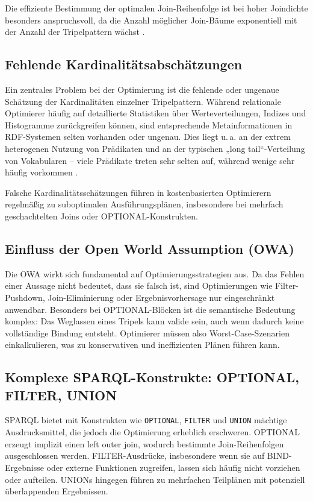 \documentclass[12pt]{article}
\begin{document}
Die effiziente Bestimmung der optimalen Join-Reihenfolge ist bei hoher Joindichte besonders anspruchsvoll, da die Anzahl möglicher Join-Bäume exponentiell mit der Anzahl der Tripelpattern wächst \cite{gubichev2013sparql}.

\subsection{Fehlende Kardinalitätsabschätzungen}

Ein zentrales Problem bei der Optimierung ist die fehlende oder ungenaue Schätzung der Kardinalitäten einzelner Tripelpattern. Während relationale Optimierer häufig auf detaillierte Statistiken über Werteverteilungen, Indizes und Histogramme zurückgreifen können, sind entsprechende Metainformationen in RDF-Systemen selten vorhanden oder ungenau. Dies liegt u.\,a. an der extrem heterogenen Nutzung von Prädikaten und an der typischen „long tail“-Verteilung von Vokabularen – viele Prädikate treten sehr selten auf, während wenige sehr häufig vorkommen \cite{stahl2012rdf}.

Falsche Kardinalitätsschätzungen führen in kostenbasierten Optimierern regelmäßig zu suboptimalen Ausführungsplänen, insbesondere bei mehrfach geschachtelten Joins oder OPTIONAL-Konstrukten.

\subsection{Einfluss der Open World Assumption (OWA)}

Die OWA wirkt sich fundamental auf Optimierungsstrategien aus. Da das Fehlen einer Aussage nicht bedeutet, dass sie falsch ist, sind Optimierungen wie Filter-Pushdown, Join-Eliminierung oder Ergebnisvorhersage nur eingeschränkt anwendbar. Besonders bei OPTIONAL-Blöcken ist die semantische Bedeutung komplex: Das Weglassen eines Tripels kann valide sein, auch wenn dadurch keine vollständige Bindung entsteht. Optimierer müssen also Worst-Case-Szenarien einkalkulieren, was zu konservativen und ineffizienten Plänen führen kann.

\subsection{Komplexe SPARQL-Konstrukte: OPTIONAL, FILTER, UNION}

SPARQL bietet mit Konstrukten wie \texttt{OPTIONAL}, \texttt{FILTER} und \texttt{UNION} mächtige Ausdrucksmittel, die jedoch die Optimierung erheblich erschweren. OPTIONAL erzeugt implizit einen left outer join, wodurch bestimmte Join-Reihenfolgen ausgeschlossen werden. FILTER-Ausdrücke, insbesondere wenn sie auf BIND-Ergebnisse oder externe Funktionen zugreifen, lassen sich häufig nicht vorziehen oder aufteilen. UNIONs hingegen führen zu mehrfachen Teilplänen mit potenziell überlappenden Ergebnissen.
\end{document}
